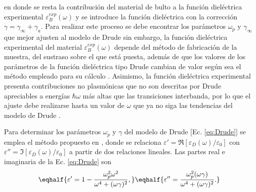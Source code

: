 en donde se resta la contribución del material de bulto  a la función dieléctrica experimental $ \varepsilon_B^{exp}(\omega)$ y se introduce la función dieléctrica con la corrección $\gamma = \gamma_\infty+\gamma_a$. Para realizar este proceso se debe encontrar los parámetros $\omega_p$ y $\gamma_\infty$ que mejor ajusten al modelo de Drude sin embargo, la función dieléctrica experimental del material $\varepsilon_B^{exp}(\omega)$ depende del método de fabricación de la muestra, del sustraso sobre el que está puesta, además de que  los valores de los parámetros de la función dieléctrica tipo Drude cambian de valor según sea el método empleado para su cálculo \cite{svetovoy2008optical}.  Asimismo, la función dieléctrica experimental presenta contribuciones no plasmónicas que no son descritas por Drude apreciables a energías $\hbar\omega$ más altas que las transiciones interbanda, por lo que el ajuste debe realizarse hasta un valor de $\omega$ que ya no siga las tendencias del modelo de Drude \cite{mendoza2014determination}.

Para determinar los parámetros $\omega_p$ y $\gamma$ del modelo de Drude [Ec. \eqref{eq:Drude}] se emplea el método propuesto en \cite{mendoza2014determination}, donde se relaciona $\varepsilon' = \Re[\varepsilon_D(\omega)/\varepsilon_0]$ con $\varepsilon''=\Im[\varepsilon_D(\omega)/\varepsilon_0]$ a partir de dos relaciones lineales. Las partes real e imaginaria de la Ec. \eqref{eq:Drude} son \begin{subequations}

	\eqhalf{\varepsilon' =
		 1 - \frac{\omega_p^2 \omega^2}{\omega^4 + (\omega\gamma)^2},
		 \label{eqs:ReDrude}}
	\eqhalf{\varepsilon'' =
		 \frac{\omega_p^2  (\omega\gamma)}{\omega^4 + (\omega\gamma)^2}.
		 \label{eqs:ImDrude}
			}\end{subequations} \noindent

